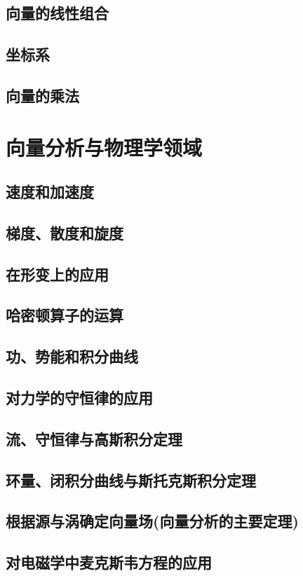 \section{向量的线性组合}
\section{坐标系}
\section{向量的乘法}

\chapter{向量分析与物理学领域}
\section{速度和加速度}
\section{梯度、散度和旋度}
\section{在形变上的应用}
\section{哈密顿算子的运算}
\section{功、势能和积分曲线}
\section{对力学的守恒律的应用}
\section{流、守恒律与高斯积分定理}
\section{环量、闭积分曲线与斯托克斯积分定理}
\section{根据源与涡确定向量场(向量分析的主要定理)}
\section{对电磁学中麦克斯韦方程的应用}

